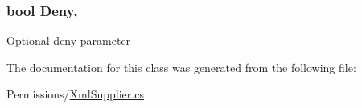 \subsubsection[{Deny}]{\setlength{\rightskip}{0pt plus 5cm}bool Deny\hspace{0.3cm}{\ttfamily [get]}, {\ttfamily [set]}}\label{classOTA_1_1Permissions_1_1XmlNode_a5955d5846b0f297efe1d830d1b854279}


Optional deny parameter 



The documentation for this class was generated from the following file\+:\begin{DoxyCompactItemize}
\item 
Permissions/\hyperlink{XmlSupplier_8cs}{Xml\+Supplier.\+cs}\end{DoxyCompactItemize}
